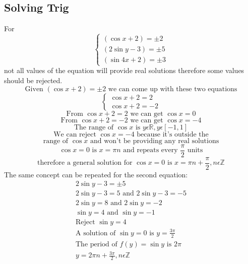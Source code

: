 \documentclass[a4paper,12pt]{article}
\begin{document}
\subsection*{Solving Trig}
For \newline
$$
\begin{cases}
    (\cos x+2) = \pm 2 \\
    (2\sin y-3) = \pm 5 \\
    (\sin 4x+2) = \pm 3 
\end{cases}
$$
\newline
not all values of the equation will provide real solutions therefore some values should be rejected. \newline
$$\text{Given } (\cos x+2) = \pm 2 \text{ we can come up with these two equations}$$
$$
\begin{cases}
    \cos x+2 = 2 \\
    \cos x+2 = -2
\end{cases}
$$
$$\text{From } \cos x+2 = 2 \text{ we can get } \cos x=0$$ \newline
$$\text{From } \cos x+2 = -2 \text{ we can get } \cos x=-4$$ \newline
$$\text{The range of } \cos x \text{ is } y\epsilon\mathbb{R}, y\epsilon [-1, 1]$$ \newline
$$\text{We can reject } \cos x=-4 \text{ because it's outside the}$$
$$\text{range of } \cos x\text{ and won't be providing any real solutions}$$\newline
$$\cos x=0 \text{ is } x = \pi n \text{ and repeats every } \frac{\pi}{2}\text{ units}$$
$$\text{therefore a general solution for }\cos x=0 \text{ is } x = \pi n + \frac{\pi}{2}, n\epsilon\mathbb{Z}$$
The same concept can be repeated for the second equation:
\begin{equation}
    \begin{split}
        2\sin y-3 = \pm 5 \\
        2\sin y-3 = 5 \text{ and } 2\sin y-3 =-5 \\
        2\sin y= 8 \text{ and } 2\sin y=-2 \\
        \sin y= 4 \text{ and } \sin y=-1 \\
        \text{Reject } \sin y=4 \\
        \text{A solution of } \sin y=0 \text{ is } y= \frac{3\pi}{2}\\
        \text{The period of } f(y)=\sin y \text{ is } 2\pi\\
        y = 2\pi n + \frac{3\pi}{2}, n\epsilon\mathbb{Z}
    \end{split}
\end{equation}
\end{document}
